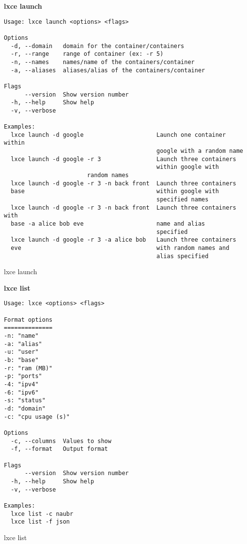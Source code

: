 \newpage
\textbf{lxce launch}
\begin{listing}[H]
\begin{verbatim}
Usage: lxce launch <options> <flags>

Options
  -d, --domain   domain for the container/containers         
  -r, --range    range of container (ex: -r 5)             
  -n, --names    names/name of the containers/container                  
  -a, --aliases  aliases/alias of the containers/container               

Flags
      --version  Show version number                                   
  -h, --help     Show help                                             
  -v, --verbose

Examples:
  lxce launch -d google                     Launch one container within 
                                            google with a random name
  lxce launch -d google -r 3                Launch three containers 
                                            within google with 
					    random names
  lxce launch -d google -r 3 -n back front  Launch three containers 
  base                                      within google with 
                                            specified names
  lxce launch -d google -r 3 -n back front  Launch three containers with 
  base -a alice bob eve                     name and alias
                                            specified
  lxce launch -d google -r 3 -a alice bob   Launch three containers 
  eve                                       with random names and 
                                            alias specified
\end{verbatim}
\caption{lxce launch}
\label{listings: lxce launch}
\end{listing}

\newpage
\textbf{lxce list}
\begin{listing}[H]
\begin{verbatim}
Usage: lxce <options> <flags>

Format options
==============
-n: "name"
-a: "alias"
-u: "user"
-b: "base"
-r: "ram (MB)"
-p: "ports"
-4: "ipv4"
-6: "ipv6"
-s: "status"
-d: "domain"
-c: "cpu usage (s)"

Options
  -c, --columns  Values to show                                         
  -f, --format   Output format                                          

Flags
      --version  Show version number                                   
  -h, --help     Show help                                             
  -v, --verbose

Examples:
  lxce list -c naubr
  lxce list -f json
\end{verbatim}
\caption{lxce list}
\label{listings: lxce list}
\end{listing}

